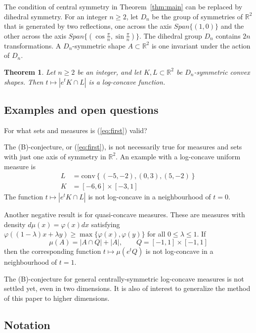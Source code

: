 \documentclass[a4paper,10pt,twoside,reqno,intlimits]{amsart}
\newtheorem{theorem}{Theorem}
\begin{document}
The condition of central symmetry in Theorem~\ref{thm:main} can be replaced by dihedral symmetry.
For an integer $n \ge 2$, let $D_n$ be the group of symmetries of ${\mathbb{R}}^2$ that is generated by two
reflections, one across the axis $Span\{(1,0)\}$ and the other across the axis
$Span\{(\cos\frac{\pi}{n}, \sin\frac{\pi}{n})\}$.
The dihedral group $D_n$ contains $2n$ transformations.
A $D_n$-symmetric shape $A \subset {\mathbb{R}}^2$ is one invariant under the action of $D_n$.

\begin{theorem}
\label{thm:dihedral}
Let $n \ge 2$ be an integer, and let $K,L \subset {\mathbb{R}}^2$ be $D_n$-symmetric convex shapes.
Then $t \mapsto |e^t K \cap L|$ is a log-concave function.
\end{theorem}

\subsection*{Examples and open questions}

For what sets and measures is (\ref{eq:first}) valid?

The (B)-conjecture, or (\ref{eq:first}), is not necessarily true for measures and sets with just
one axis of symmetry in ${\mathbb{R}}^2$.
An example with a log-concave uniform measure is
\begin{align*}
L & = {\text{conv}} \left\{ (-5,-2) , (0,3) , (5,-2) \right\} \\
K & = [-6, 6] \times [-3, 1]
\end{align*}
The function $t \mapsto |e^t K \cap L|$ is not log-concave in a neighbourhood of $t = 0$.

Another negative result is for quasi-concave measures.
These are measures with density $d\mu(x) = \varphi(x) dx$ satisfying
$\varphi( (1-\lambda) x + \lambda y ) \ge \max\{\varphi(x), \varphi(y)\}$ for all $0 \le \lambda \le 1$.
If
$$ \mu(A) = |A \cap Q | + |A|, \qquad Q = [-1, 1] \times [-1, 1] $$
then the corresponding function $t \mapsto \mu(e^t Q)$ is not log-concave in a neighbourhood of $t = 1$.

The (B)-conjecture for general centrally-symmetric log-concave measures is not settled yet, even in
two dimensions.
It is also of interest to generalize the method of this paper to higher dimensions.

\subsection*{Notation}
\end{document}
